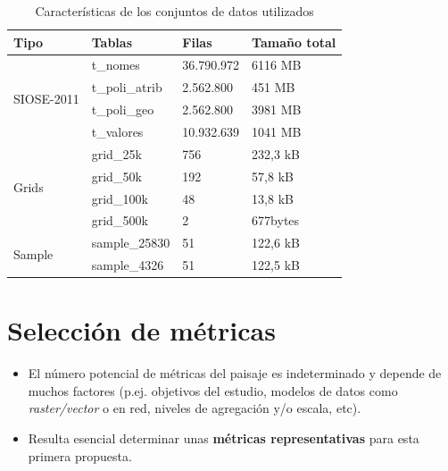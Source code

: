 \begin{table}[]
\centering
\caption{Características de los conjuntos de datos utilizados\label{tab:datos}}
\begin{tabular}{@{}llll@{}}
\toprule
\textbf{Tipo}               & \textbf{Tablas} & \textbf{Filas} & \textbf{Tamaño total} \\ \midrule
\multirow{4}{*}{SIOSE-2011} & t\_nomes        & 36.790.972     & 6116 MB               \\
                            & t\_poli\_atrib  & 2.562.800      & 451 MB                \\
                            & t\_poli\_geo    & 2.562.800      & 3981 MB               \\
                            & t\_valores      & 10.932.639     & 1041 MB               \\ \midrule
\multirow{4}{*}{Grids}      & grid\_25k       & 756            & 232,3 kB              \\
                            & grid\_50k       & 192            & 57,8 kB               \\
                            & grid\_100k      & 48             & 13,8 kB               \\
                            & grid\_500k      & 2              & 677bytes              \\ \midrule
\multirow{2}{*}{Sample}     & sample\_25830   & 51             & 122,6 kB              \\
                            & sample\_4326    & 51             & 122,5 kB              \\ \bottomrule
\end{tabular}
\end{table}


\section{Selección de métricas}

\begin{graybox}
\begin{itemize}
\item El número potencial de métricas del paisaje es indeterminado y depende de muchos factores (p.ej. objetivos del estudio, modelos de datos como \textit{raster/vector} o en red, niveles de agregación y/o escala, etc).
\item Resulta esencial determinar unas \textbf{métricas representativas} para esta primera propuesta.
\end{itemize}
\end{graybox}

